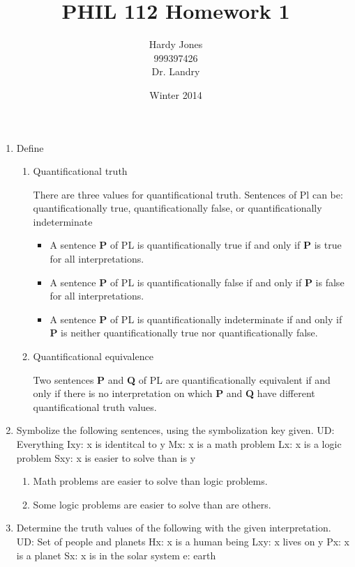 \documentclass[12pt,letterpaper]{article}
\title{PHIL 112 Homework 1\vspace{-2ex}}
\author{Hardy Jones\\
        999397426\\
        Dr. Landry\vspace{-2ex}}
\date{Winter 2014}
\begin{document}
  \maketitle

  \begin{enumerate}
    \item Define
      \begin{enumerate}
        \item Quantificational truth

          There are three values for quantificational truth.
          Sentences of Pl can be:
          quantificationally true, quantificationally false, or quantificationally indeterminate
          \begin{itemize}
            \item
              A sentence \textbf{P} of PL is quantificationally true if and only if
              \textbf{P} is true for all interpretations.
            \item
              A sentence \textbf{P} of PL is quantificationally false if and only if
              \textbf{P} is false for all interpretations.
            \item
              A sentence \textbf{P} of PL is quantificationally indeterminate if and only if
              \textbf{P} is neither quantificationally true nor quantificationally false.
          \end{itemize}
        \item Quantificational equivalence

          Two sentences \textbf{P} and \textbf{Q} of PL are quantificationally equivalent if and only if
          there is no interpretation on which \textbf{P} and \textbf{Q} have different quantificational truth values.
      \end{enumerate}
    \item Symbolize the following sentences, using the symbolization key given.
      UD: Everything
      Ixy: x is identitcal to y
      Mx: x is a math problem
      Lx: x is a logic problem
      Sxy: x is easier to solve than is y
      \begin{enumerate}
        \item Math problems are easier to solve than logic problems.
        \item Some logic problems are easier to solve than are others.
      \end{enumerate}
    \item Determine the truth values of the following with the given interpretation.
      UD: Set of people and planets
      Hx: x is a human being
      Lxy: x lives on y
      Px: x is a planet
      Sx: x is in the solar system
      e: earth


\end{enumerate}
\end{document}
